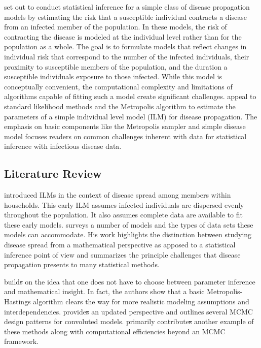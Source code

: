 \documentclass{uwstat572}
\newcommand{\vmdel}[1]{\sout{#1}}
\newcommand{\vmadd}[1]{\textbf{\color{red}{#1}}}
\begin{document}
\citet{Brown} set out to conduct statistical inference for a simple class of disease propagation models by estimating the risk that a susceptible individual contracts a disease from an infected member of the population. 
In these models, the risk of contracting the disease is modeled at the individual level rather than for the population as a whole. 
The goal is to formulate models that reflect changes in individual risk that correspond to the number of the infected individuals, their proximity to susceptible members of the population, and the duration a susceptible individuals\vmadd{'}  exposure to those infected. 
While this model is conceptually convenient, the computational complexity and limitations of algorithms capable of fitting such a model create significant challenges.
\citet{Brown} appeal to standard likelihood methods and the Metropolis algorithm \citep{Metropolis} to estimate the parameters of a simple individual level model (ILM) for disease propagation.
The emphasis on basic components like the Metropolis sampler and simple disease model focuses readers on common challenges inherent with data for statistical inference with infectious disease data. 

\subsection{Literature Review}
\label{literature_review}
\citet{Haber} introduced ILMs in the context of disease spread among members within households. 
This early ILM assumes infected individuals are dispersed evenly throughout the population. 
It also assumes complete data are available to fit these early models. 
\citet{Becker} surveys a number of models and the types of data sets these models can accommodate. 
His work highlights the distinction between studying disease spread from a mathematical perspective as apposed to a statistical inference point of view and summarizes the principle challenges that disease propagation presents to many statistical methods.

\citet{ONeill} build\vmdel{s} on the idea that one does not have to choose between parameter inference and mathematical insight. 
In fact, the authors show that a basic Metropolis-Hastings algorithm clears the way for more realistic modeling assumptions and interdependencies. 
\citet{Jewell} provide\vmdel{s} an updated perspective and outlines several MCMC design patterns for convoluted models.
\citet{Brown} primarily contribute\vmdel{s} another example of these methods along with computational efficiencies beyond an MCMC framework. 
\end{document}
